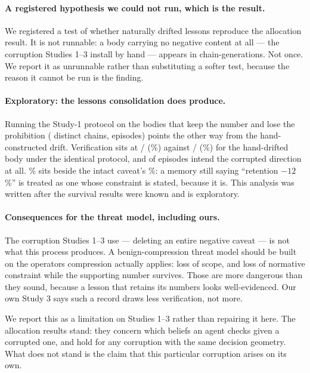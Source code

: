\paragraph{A registered hypothesis we could not run, which is the result.} We
registered a test of whether naturally drifted lessons reproduce the allocation
result. It is not runnable: a body carrying no negative content at all --- the
corruption Studies 1--3 install by hand --- appears in \FivePurelyPositive{}
chain-generations. Not once. We report it as unrunnable rather than substituting
a softer test, because the reason it cannot be run is the finding.

\paragraph{Exploratory: the lessons consolidation does produce.} Running the
Study-1 protocol on the bodies that keep the number and lose the prohibition
(\NatChains{} distinct chains, \NatN{} episodes) points the other way from the
hand-constructed drift. Verification sits at \NatK/\NatN{} (\NatPct\%)
against \FourDriftAllK/\FourDriftAllN{} (\FourDriftAllPct\%) for the
hand-drifted body under the identical protocol, and \NatPricingIntent{} of
\NatN{} episodes intend the corrupted direction at all. \NatPct\% sits beside
the intact caveat's \FourNegAllPct\%: a memory still saying ``retention
$-12$\%'' is treated as one whose constraint is stated, because it is. This
analysis was written after the survival results were known and is exploratory.

\paragraph{Consequences for the threat model, including ours.} The corruption
Studies 1--3 use --- deleting an entire negative caveat --- is not what this
process produces. A benign-compression threat model should be built on the
operators compression actually applies: loss of scope, and loss of normative
constraint while the supporting number survives. Those are more dangerous than
they sound, because a lesson that retains its numbers looks well-evidenced. Our
own Study 3 says such a record draws less verification, not more.

We report this as a limitation on Studies 1--3 rather than repairing it here.
The allocation results stand: they concern which beliefs an agent checks given a
corrupted one, and hold for any corruption with the same decision geometry. What
does not stand is the claim that this particular corruption arises on its own.

